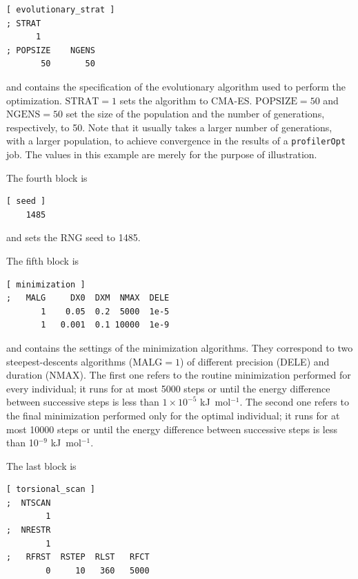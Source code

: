 \documentclass[10pt,a4paper,openany]{memoir}
\numberwithin{equation}{section}
\newcommand{\profileropt}[0]{\texttt{profilerOpt}}
\newcommand{\varset}[2]{$\text{#1}=#2$}
\begin{document}
\begin{lstlisting}[language=gromacs]
[ evolutionary_strat ]
; STRAT
      1
; POPSIZE    NGENS  
       50       50
\end{lstlisting}\vspace{2ex}\par

\noindent and contains the specification of the evolutionary algorithm
used to perform the optimization.  \varset{STRAT}{1} sets the
algorithm to CMA-ES.  \varset{POPSIZE}{50} and \varset{NGENS}{50} set
the size of the population and the number of generations,
respectively, to 50. Note that it usually takes a larger number of
generations, with a larger population, to achieve convergence in the
results of a \profileropt{} job. The values in this example are merely
for the purpose of illustration.

The fourth block is

\begin{lstlisting}[language=gromacs]
[ seed ]
    1485
\end{lstlisting}\vspace{2ex}\par

\noindent and sets the RNG seed to 1485.

The fifth block is

\begin{lstlisting}[language=gromacs]
[ minimization ]
;   MALG     DX0  DXM  NMAX  DELE
       1    0.05  0.2  5000  1e-5
       1   0.001  0.1 10000  1e-9
\end{lstlisting}\vspace{2ex}\par

\noindent and contains the settings of the minimization algorithms.  They
correspond to two steepest-descents algorithms (\varset{MALG}{1}) of different
precision (DELE) and duration (NMAX).
%
The first one refers to the routine minimization performed for every individual;
it runs for at most 5000 steps or until the energy difference between successive
steps is less than $1\times 10^{-5}$ kJ~mol$^{-1}$.
%
The second one refers to the final minimization performed only for the optimal
individual; it runs for at most 10000 steps or until the energy difference
between successive steps is less than 10$^{-9}$ kJ~mol$^{-1}$.
%

The last block is

\begin{lstlisting}[language=gromacs]
[ torsional_scan ]
;  NTSCAN
        1
;  NRESTR
        1
;   RFRST  RSTEP  RLST   RFCT
        0     10   360   5000
\end{lstlisting}\vspace{2ex}\par
\end{document}
